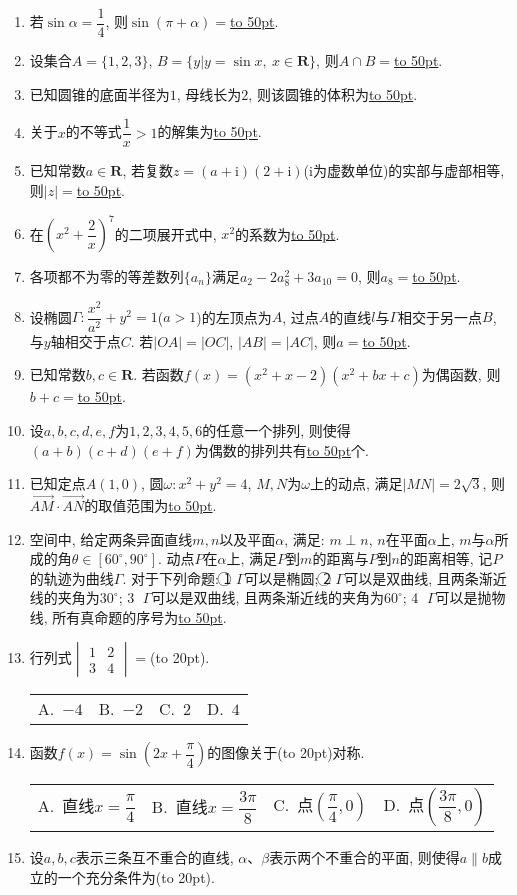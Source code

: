 \documentclass[10pt,a4paper]{article}
\newcommand{\blank}[1]{\underline{\hbox to #1pt{}}}
\newcommand{\bracket}[1]{(\hbox to #1pt{})}
\newcommand{\fourch}[4]{\par\begin{tabular}{p{.23\textwidth}p{.23\textwidth}p{.23\textwidth}p{.23\textwidth}}
A.~#1 &B.~#2& C.~#3& D.~#4
\end{tabular}}
\begin{document}
\begin{enumerate}[1.]
\item 若$\sin\alpha=\dfrac 14$, 则$\sin(\pi+\alpha)=$\blank{50}.
\item 设集合$A=\{1,2,3\}$, $B=\{y|y=\sin x, \ x\in \mathbf{R}\}$, 则$A\cap B=$\blank{50}.
\item 已知圆锥的底面半径为$1$, 母线长为$2$, 则该圆锥的体积为\blank{50}.
\item 关于$x$的不等式$\dfrac{1}{x}>1$的解集为\blank{50}.
\item 已知常数$a\in \mathbf{R}$, 若复数$z=(a+\mathrm{i})(2+\mathrm{i})$($\mathrm{i}$为虚数单位)的实部与虚部相等, 则$|z|=$\blank{50}.
\item 在$(x^2+\dfrac 2x)^7$的二项展开式中, $x^2$的系数为\blank{50}.
\item 各项都不为零的等差数列$\{a_n\}$满足$a_2-2a_8^2+3a_{10}=0$, 则$a_8=$\blank{50}.
\item 设椭圆$\Gamma:\dfrac{x^2}{a^2}+y^2=1$($a>1$)的左顶点为$A$, 过点$A$的直线$l$与$\Gamma$相交于另一点$B$, 与$y$轴相交于点$C$. 若$|OA|=|OC|$, $|AB|=|AC|$, 则$a=$\blank{50}.
\item 已知常数$b,c\in \mathbf{R}$. 若函数$f(x)=(x^2+x-2)(x^2+bx+c)$为偶函数, 则$b+c=$\blank{50}.
\item 设$a,b,c,d,e,f$为$1,2,3,4,5,6$的任意一个排列, 则使得$(a+b)(c+d)(e+f)$为偶数的排列共有\blank{50}个.
\item 已知定点$A(1,0)$, 圆$\omega:x^2+y^2=4$, $M,N$为$\omega$上的动点, 满足$|MN|=2\sqrt{3}$, 则$\overrightarrow{AM}\cdot \overrightarrow{AN}$的取值范围为\blank{50}.
\item 空间中, 给定两条异面直线$m,n$以及平面$\alpha$, 满足: $m\perp n$, $n$在平面$\alpha$上, $m$与$\alpha$所成的角$\theta\in [60^\circ,90^\circ]$. 动点$P$在$\alpha$上, 满足$P$到$m$的距离与$P$到$n$的距离相等, 记$P$的轨迹为曲线$\Gamma$. 对于下列命题: \textcircled{1} $\Gamma$可以是椭圆; \textcircled{2} $\Gamma$可以是双曲线, 且两条渐近线的夹角为$30^\circ$; \textcircled{3} $\Gamma$可以是双曲线, 且两条渐近线的夹角为$60^\circ$; \textcircled{4} $\Gamma$可以是抛物线, 所有真命题的序号为\blank{50}.
\item 行列式$\begin{vmatrix}1 & 2 \\ 3 & 4\end{vmatrix}=$\bracket{20}.
\fourch{$-4$}{$-2$}{$2$}{$4$}
\item 函数$f(x)=\sin(2x+\dfrac\pi 4)$的图像关于\bracket{20}对称.
\fourch{直线$x=\dfrac\pi 4$}{直线$x=\dfrac{3\pi}8$}{点$(\dfrac\pi 4,0)$}{点$(\dfrac{3\pi}8,0)$}
\item 设$a,b,c$表示三条互不重合的直线, $\alpha$、$\beta$表示两个不重合的平面, 则使得$a\parallel b$成立的一个充分条件为\bracket{20}.

\end{enumerate}
\end{document}
